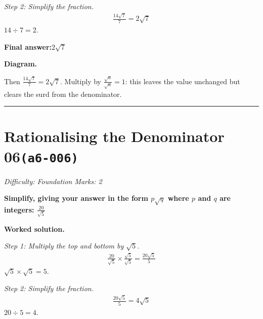 \documentclass[11pt]{article}
\newcommand{\question}[1]{\par\medskip\noindent\textbf{#1}\par}
\begin{document}
\textit{Step 2: Simplify the fraction.}
\[\begin{gathered}
\frac{14\sqrt{7}}{7} = 2\sqrt{7}
\end{gathered}\]
\( 14 \div 7 = 2 \).

\begin{answerbox}
\textbf{Final answer:}\quad \(\displaystyle 2\sqrt{7}\)
\end{answerbox}
\textbf{Diagram.}

\begin{center}
\end{center}
\small Then $\frac{14\sqrt7}{7}=2\sqrt7$. Multiply by $\frac{\sqrt{a}}{\sqrt{a}}=1$: this leaves the value unchanged but clears the surd from the denominator.\normalsize

\medskip\hrule

\section*{Rationalising the Denominator 06\quad\small\texttt{(a6-006)}}
\textit{Difficulty: Foundation \quad\textbar\quad Marks: 2}

\question{Simplify, giving your answer in the form \( p\sqrt{q} \) where \( p \) and \( q \) are integers: \( \frac{20}{\sqrt{5}} \)}

\textbf{Worked solution.}

\textit{Step 1: Multiply the top and bottom by \( \sqrt{5} \).}
\[\begin{gathered}
\frac{20}{\sqrt{5}} \times \frac{\sqrt{5}}{\sqrt{5}} = \frac{20\sqrt{5}}{5}
\end{gathered}\]
\( \sqrt{5} \times \sqrt{5} = 5 \).

\textit{Step 2: Simplify the fraction.}
\[\begin{gathered}
\frac{20\sqrt{5}}{5} = 4\sqrt{5}
\end{gathered}\]
\( 20 \div 5 = 4 \).
\end{document}
